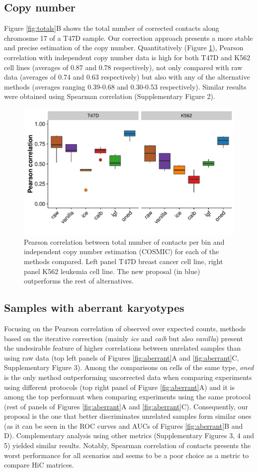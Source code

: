 \documentclass{bioinfo}
\begin{document}
\subsection{Copy number}

Figure \ref{fig:totals}B shows the total number of corrected contacts along chromosme 17 of a T47D sample. Our correction approach presents a more stable and precise estimation of the copy number. Quantitatively (Figure \ref{fig:copy_number}), Pearson correlation with independent copy number data is high for both T47D and K562 cell lines (averages of 0.87 and 0.78 respectively), not only compared with raw data (averages of 0.74 and 0.63 respectively) but also with any of the alternative methods (averages ranging 0.39-0.68 and 0.30-0.53 respectively). Similar results were obtained using Spearman correlation (Supplementary Figure 2).


\begin{figure}
	\centerline{\includegraphics[width=.45\textwidth]{img/copy_number_figure2.pdf}}
	\caption{
		Pearson correlation between total number of contacts per bin and independent copy number estimation (COSMIC) for each of the methods compared. Left panel T47D breast cancer cell line, right panel K562 leukemia cell line. The new proposal (in blue) outperforms the rest of alternatives.
	}\label{fig:copy_number}
\end{figure}

\subsection{Samples with aberrant karyotypes}

Focusing on the Pearson correlation of observed over expected counts, methods based on the iterative correction (mainly \textit{ice} and \textit{caib} but also \textit{vanilla}) present the undesirable feature of higher correlations between unrelated samples than using raw data (top left panels of Figures \ref{fig:aberrant}A and \ref{fig:aberrant}C, Supplementary Figure 3). Among the comparisons on cells of the same type, \textit{oned} is the only method outperforming uncorrected data when comparing experiments using different protocols (top right panel of Figure \ref{fig:aberrant}A) and it is among the top performant when comparing experiments using the same protocol (rest of panels of Figures \ref{fig:aberrant}A and \ref{fig:aberrant}C). Consequently, our proposal is the one that better discriminates unrelated samples form similar ones (as it can be seen in the ROC curves and AUCs of Figures \ref{fig:aberrant}B and D). Complementary analysis using other metrics (Supplementary Figures 3, 4 and 5) yielded similar results. Notably, Spearman correlation of contacts presents the worst performance for all scenarios and seems to be a poor choice as a metric to compare HiC matrices.
\end{document}
